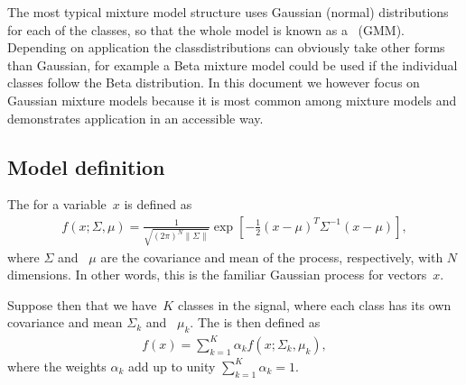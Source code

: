 \documentclass[letterpaper,10pt,english]{jupyterBook}
\begin{document}
\sphinxAtStartPar
The most typical mixture model structure uses Gaussian (normal)
distributions for each of the classes, so that the whole model is known
as a  (GMM). Depending on application the
class\sphinxhyphen{}distributions can obviously take other forms than Gaussian, for
example a Beta mixture model could be used if the individual classes
follow the Beta distribution. In this document we however focus on
Gaussian mixture models because it is most common among mixture models
and demonstrates application in an accessible way.


\subsection{Model definition}
\label{\detokenize{Modelling/Gaussian_mixture_model_GMM:model-definition}}
\sphinxAtStartPar
The 
for a variable \(x\) is defined as
\begin{equation*}
\begin{split} f\left(x;\Sigma,\mu\right) =
\frac{1}{\sqrt{\left(2\pi\right)^N \|\Sigma\|}}
\exp\left[-\frac12 (x-\mu)^T \Sigma^{-1}(x-\mu)\right], \end{split}
\end{equation*}
\sphinxAtStartPar
where \( \Sigma \) and  \( \mu \) are the covariance and mean of
the process, respectively, with \(N\) dimensions. In other words, this is
the familiar Gaussian process for vectors \(x\).

\sphinxAtStartPar
Suppose then that we have \(K\) classes in the signal, where each class
has its own covariance and mean \( \Sigma_k \) and  \( \mu_k. \)
The  is then defined as
\begin{equation*}
\begin{split} \boxed{f\left(x\right) = \sum_{k=1}^K \alpha_k f\left(x;
\Sigma_k,\mu_k\right),} \end{split}
\end{equation*}
\sphinxAtStartPar
where the weights \( \alpha_k \) add up to unity \( \sum_{k=1}^K
\alpha_k=1. \)
\end{document}
